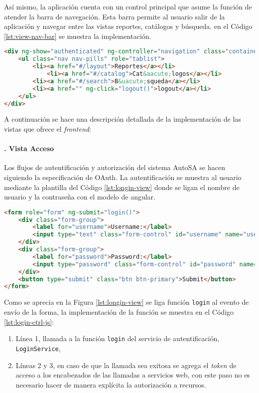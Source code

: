 Así mismo, la aplicación cuenta con un control principal que asume la función de atender la barra de navegación. Esta barra permite al usuario salir de la aplicación y navegar entre las vistas reportes, catálogos y búsqueda. en el Código \ref{lst:view-nav-bar} se muestra la implementación.

\begin{lstlisting}[language=HTML, captionpos=b, caption={Barra de navegación}, label={lst:view-nav-bar}]
<div ng-show="authenticated" ng-controller="navigation" class="container">
	<ul class="nav nav-pills" role="tablist">
		<li><a href="#/layout">Reportes</a></li>
			<li><a href="#/catalog">Cat&aacute;logos</a></li> 
		<li><a href="#/search">B&uacute;squeda</a></li>
		<li><a href="" ng-click="logout()">logout</a></li>
	</ul>
</div>
\end{lstlisting}

A continuación se hace una descripción detallada de la implementación de las vistas que ofrece el \textit{frontend}:

\paragraph{. Vista Acceso\\}
Los flujos de autentificación y autorización del sistema AutoSA se hacen siguiendo la especificación de OAuth. La autentificación se muestra al usuario mediante la plantilla del Código \ref{lst:longin-view} donde se ligan el nombre de usuario y la contraseña con el modelo de angular.

\begin{lstlisting}[language=HTML, caption={Plantilla HTML de acceso.}, captionpos=b, label={lst:longin-view}]
<form role="form" ng-submit="login()">
	<div class="form-group">
		<label for="username">Username:</label>
		<input type="text" class="form-control" id="username" name="username" ng-model="credentials.username"/>
	</div>
	<div class="form-group">
		<label for="password">Password:</label>
		<input type="password" class="form-control" id="password" name="password" ng-model="credentials.password"/>
	</div>
	<button type="submit" class="btn btn-primary">Submit</button>
</form>
\end{lstlisting}


Como se aprecia en la Figura \ref{lst:longin-view} se liga función \texttt{login} al evento de envío de la forma, la implementación de la función se muestra en el Código \ref{lst:login-ctrl-js}:
\begin{enumerate}
	\item Línea 1, llamada a la función \texttt{login} del servicio de autentificación, \texttt{LoginService},
	\item Líneas 2 y 3, en caso de que la llamada sea exitosa se agrega el \textit{token} de acceso a los encabezados de las llamadas a servicios web, con este paso no es necesario hacer de manera explícita la autorización a recursos.
\end{enumerate}

